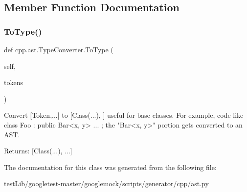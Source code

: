 \subsection{Member Function Documentation}
\mbox{\label{classcpp_1_1ast_1_1TypeConverter_aa6ea82e40cd30e5dfcd471ff144a19cf}} 
\subsubsection{\texorpdfstring{To\+Type()}{ToType()}}
{\footnotesize\ttfamily def cpp.\+ast.\+Type\+Converter.\+To\+Type (\begin{DoxyParamCaption}\item[{}]{self,  }\item[{}]{tokens }\end{DoxyParamCaption})}

\begin{DoxyVerb}Convert [Token,...] to [Class(...), ] useful for base classes.
For example, code like class Foo : public Bar<x, y> { ... };
the "Bar<x, y>" portion gets converted to an AST.

Returns:
  [Class(...), ...]
\end{DoxyVerb}
 

The documentation for this class was generated from the following file\+:\begin{DoxyCompactItemize}
\item 
test\+Lib/googletest-\/master/googlemock/scripts/generator/cpp/ast.\+py\end{DoxyCompactItemize}
